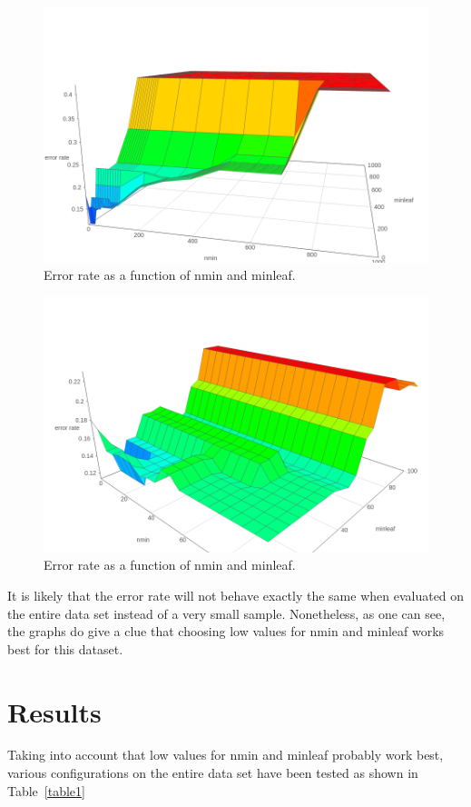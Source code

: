 \documentclass[12pt]{article}
\theoremstyle{definition}
\begin{document}
\begin{figure}[H]
    \centering
    \includegraphics[width=0.8\linewidth]{graph1.png}
    \caption{Error rate as a function of nmin and minleaf.}
\label{fig:graph1}
\end{figure}

\begin{figure}[H]
    \centering
    \includegraphics[width=0.8\linewidth]{graph2.png}
    \caption{Error rate as a function of nmin and minleaf.}
\label{fig:graph2}
\end{figure}


It is likely that the error rate will not behave exactly the same when evaluated on
the entire data set instead of a very small sample.
Nonetheless, as one can see, the graphs do give a clue that choosing low values
for nmin and minleaf works best for this dataset.

\section{Results}
\label{sec:results}

Taking into account that low values for nmin and minleaf probably work best,
various configurations on the entire data set have been tested
as shown in Table~\ref{table1}
\end{document}
